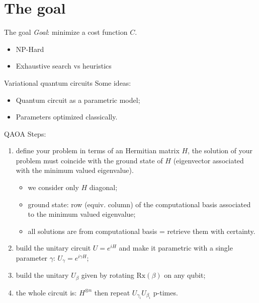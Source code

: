 \section{The goal}
\SectionPage{}

\begin{frame}{The goal}
\emph{Goal}: minimize a cost function \(C\).
\begin{itemize}
    \item<2-> NP-Hard
    \item<3-> Exhaustive search vs heuristics
\end{itemize}
\end{frame}

\begin{frame}{Variational quantum circuits}
Some ideas:
\begin{itemize}
    \item<1-> Quantum circuit as a parametric model;
    \item<2-> Parameters optimized classically. 
\end{itemize}
\end{frame}

\begin{frame}{QAOA}
Steps:
\begin{enumerate}
    \item<1-> define your problem in terms of an Hermitian matrix \(H\), the solution of your problem must coincide with the ground state of \(H\) (eigenvector associated with the minimum valued eigenvalue).
    \begin{itemize}
        \item<2-> we consider only \(H\) diagonal;
        \item<3-> ground state: row (equiv. column) of the computational basis associated to the minimum valued eigenvalue;
        \item<4-> all solutions are from computational basis = retrieve them with certainty.
    \end{itemize}
    \item<5-> build the unitary circuit \(U = e^{iH}\) and make it parametric with a single parameter \(\gamma\): \(U_\gamma = e^{i\gamma H}\);
    \item<6-> build the unitary \(U_\beta\) given by rotating \(\text{Rx}(\beta)\) on any qubit;
    \item<7-> the whole circuit is: \(H^{\otimes n}\) then repeat \(U_{\gamma_i} U_{\beta_i}\) p-times.
\end{enumerate}
\end{frame}


